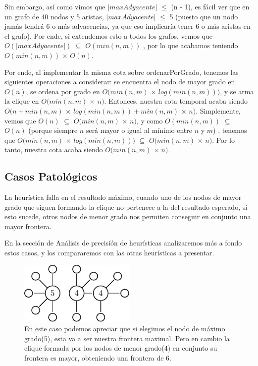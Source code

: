 Sin embargo, así como vimos que $|maxAdyacente|$ $\leq$ (n - 1), es fácil ver que en un grafo de 40 nodos y 5 aristas, $|maxAdyacente|$ $\leq$ 5 (puesto que un nodo jamás tendrá 6 o más adyacencias, ya que eso implicaría tener 6 o más aristas en el grafo). Por ende, si extendemos esto a todos los grafos, vemos que $O(|maxAdyacente|)$ $\subseteq$ $O(min(n,m))$ , por lo que acabamos teniendo $O(min(n,m))$ $\times$ $O(n)$.

Por ende, al implementar la misma cota sobre ordenarPorGrado, tenemos las siguientes operaciones a considerar: se encuentra el nodo de mayor grado en $O(n)$, se ordena por grado en $O(min(n,m)$ $\times$ $log(min(n,m)))$, y se arma la clique en $O(min(n,m)$ $\times$ $n )$.  Entonces, nuestra cota temporal acaba siendo $O(n + min(n,m)$ $\times$ $log(min(n,m)) + min(n,m)$ $\times$ $n )$. Simplemente, vemos que $O(n)$ $\subseteq$ $O(min(n,m)$ $\times$ $n )$, y como $O(min(n,m))$ $\subseteq$ $O(n)$ (porque siempre $n$ será mayor o igual al mínimo entre $n$ y $m$) , tenemos que $O(min(n,m)$ $\times$ $log(min(n,m)))$ $\subseteq$ $O(min(n,m)$ $\times$ $n )$. Por lo tanto, nuestra cota acaba siendo $O(min(n,m)$ $\times$ $n )$.

\subsection{Casos Patológicos}

La heurística falla en el resultado máximo, cuando uno de los nodos de mayor grado que siguen formando la clique no pertenece a la del resultado esperado, si esto sucede, otros nodos de menor grado nos permiten conseguir en conjunto una mayor frontera.

En la sección de Análisis de precisíón de heurísticas analizaremos más a fondo estos casos, y los compararemos con las otras heurísticas a presentar.

\begin{figure}
\caption{En este caso podemos apreciar que si elegimos el nodo de máximo grado(5), esta va a ser nuestra frontera maximal. Pero en cambio la clique formada por los nodos de menor grado(4) en conjunto su frontera es mayor, obteniendo una frontera de 6.}
\includegraphics[width=0.5\textwidth]{img/patologic.pdf}
\end{figure}

